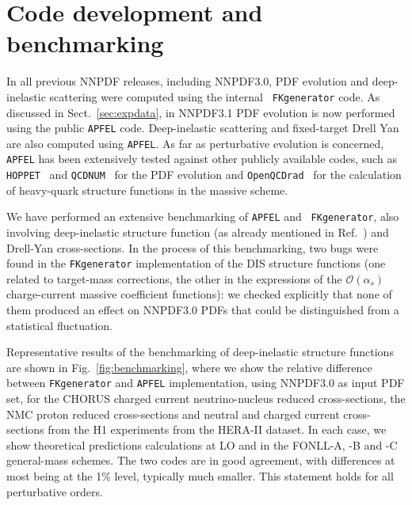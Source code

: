\section{Code development and benchmarking}
\label{sec:benchmarking}

In all previous NNPDF releases, including NNPDF3.0, PDF evolution and
deep-inelastic scattering were computed using the internal {\tt
  FKgenerator} code.  As discussed in Sect.~\ref{sec:expdata}, in
NNPDF3.1 PDF evolution is now performed using the public {\tt APFEL}
code. Deep-inelastic scattering and fixed-target Drell Yan are also
computed using {\tt APFEL}.
As far as perturbative evolution is concerned, {\tt APFEL} has been
extensively tested against other publicly available codes, such as
{\tt HOPPET}~\cite{Salam:2008qg} and {\tt QCDNUM}~\cite{Botje:2010ay}
for the PDF evolution and {\tt OpenQCDrad}~\cite{Alekhin:2013nda} for
the calculation of heavy-quark structure functions in the massive
scheme.

We have performed an extensive benchmarking of {\tt APFEL} and {\tt
  FKgenerator}, also involving deep-inelastic structure function (as
already mentioned in Ref.~\cite{Ball:2016neh}) and Drell-Yan cross-sections.
In the process of this benchmarking, two bugs were found in
the {\tt FKgenerator} implementation of the DIS structure functions
(one related to target-mass corrections, the other in the expressions
of the $\mathcal{O}(\alpha_s)$ charge-current massive coefficient
functions): we checked explicitly that none of them produced an effect
on NNPDF3.0 PDFs that could be distinguished from a statistical
fluctuation.

Representative results of the benchmarking of deep-inelastic structure
functions are shown in Fig.~\ref{fig:benchmarking}, where we show the
relative difference between {\tt FKgenerator} and {\tt APFEL}
implementation, using NNPDF3.0 as input PDF set, for the CHORUS
charged current neutrino-nucleus reduced cross-sections, the NMC
proton reduced cross-sections and neutral and charged current cross-sections
 from the H1 experiments from the HERA-II dataset.  In each
case, we show theoretical predictions calculations at LO and in the FONLL-A,
-B and -C general-mass schemes. The two codes are in good agreement, with
differences at most being at the 1\% level, typically much smaller.
%
This statement holds for all perturbative orders.

